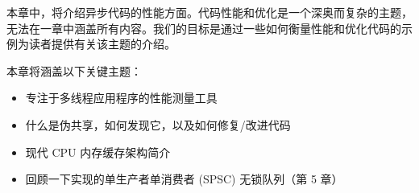 本章中，将介绍异步代码的性能方面。代码性能和优化是一个深奥而复杂的主题，无法在一章中涵盖所有内容。我们的目标是通过一些如何衡量性能和优化代码的示例为读者提供有关该主题的介绍。

本章将涵盖以下关键主题：

\begin{itemize}
\item
专注于多线程应用程序的性能测量工具

\item
什么是伪共享，如何发现它，以及如何修复/改进代码

\item
现代 CPU 内存缓存架构简介

\item
回顾一下实现的单生产者单消费者 (SPSC) 无锁队列（第 5 章）
\end{itemize}